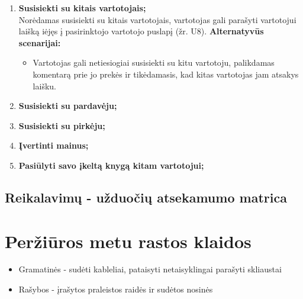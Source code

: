 \documentclass{VUMIFPSkursinis}
\begin{document}
\begin{enumerate}[label=\textbf{U\arabic*.}]
			\item \textbf{Susisiekti su kitais vartotojais;}\\
				Norėdamas susisiekti su kitais vartotojais, vartotojas gali parašyti vartotojui laišką iėjęs į pasirinktojo vartotojo puslapį (žr. U8).
				\textbf{Alternatyvūs scenarijai:}
				\begin{itemize}
					\item Vartotojas gali netiesiogiai susisiekti su kitu vartotoju, palikdamas komentarą prie jo prekės ir tikėdamasis, kad kitas vartotojas jam atsakys laišku.
				\end{itemize}
			\item \textbf{Susisiekti su pardavėju;}\\
			\item \textbf{Susisiekti su pirkėju;}\\
			\item \textbf{Įvertinti mainus;}\\ %
			\item \textbf{Pasiūlyti savo įkeltą knygą kitam vartotojui;}
		\end{enumerate}
	\subsection{Reikalavimų - užduočių atsekamumo matrica}

\section{Peržiūros metu rastos klaidos}
	\begin{itemize}
		\item Gramatinės - sudėti kableliai, pataisyti netaisyklingai parašyti skliaustai
		\item Rašybos - įrašytos praleistos raidės ir sudėtos nosinės
	\end{itemize}

	
\setcounter{secnumdepth}{0}
\end{document}
